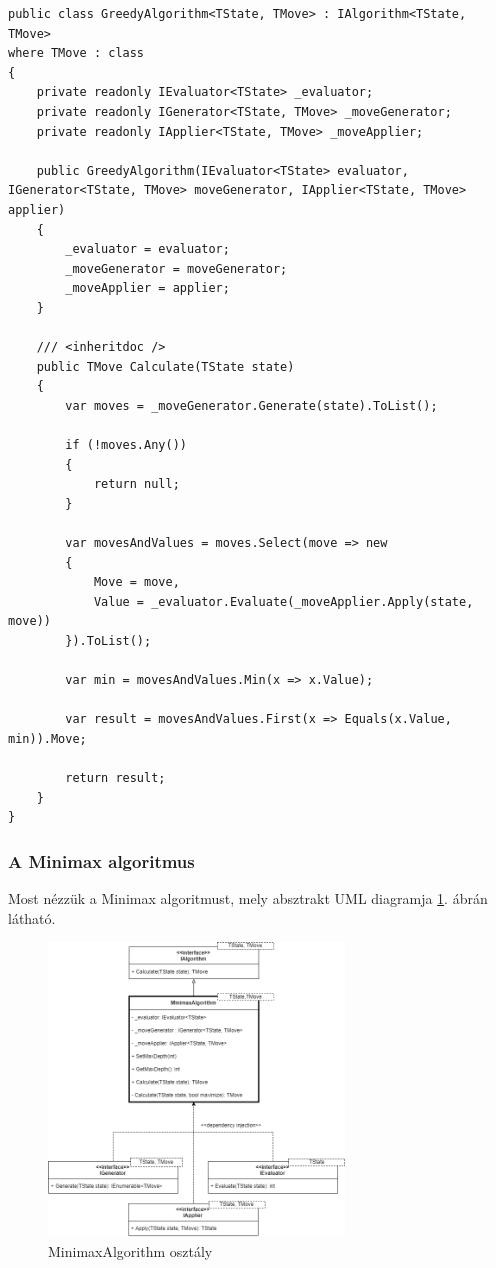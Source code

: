 \documentclass[twoside, a4paper, 12pt]{article}
\begin{document}
\begin{lstlisting}[caption=Mohó algoritmus, label=lst:greedy_code, float]
public class GreedyAlgorithm<TState, TMove> : IAlgorithm<TState, TMove>
where TMove : class
{
	private readonly IEvaluator<TState> _evaluator;
	private readonly IGenerator<TState, TMove> _moveGenerator;
	private readonly IApplier<TState, TMove> _moveApplier;
	
	public GreedyAlgorithm(IEvaluator<TState> evaluator, IGenerator<TState, TMove> moveGenerator, IApplier<TState, TMove> applier)
	{
		_evaluator = evaluator;
		_moveGenerator = moveGenerator;
		_moveApplier = applier;
	}
	
	/// <inheritdoc />
	public TMove Calculate(TState state)
	{
		var moves = _moveGenerator.Generate(state).ToList();
		
		if (!moves.Any())
		{
			return null;
		}
		
		var movesAndValues = moves.Select(move => new
		{
			Move = move,
			Value = _evaluator.Evaluate(_moveApplier.Apply(state, move))
		}).ToList();
		
		var min = movesAndValues.Min(x => x.Value);
		
		var result = movesAndValues.First(x => Equals(x.Value, min)).Move;
		
		return result;
	}
}
\end{lstlisting}

\subsubsection{A Minimax algoritmus}
Most nézzük a Minimax algoritmust, mely absztrakt UML diagramja \ref{fig:minimaxAbstractDiagram}. ábrán látható.

\begin{figure}[htbp]
	\centering
	\includegraphics[width=0.7\textwidth]{img/minimaxAbstractDiagram.png}
	\caption{MinimaxAlgorithm osztály}
	\label{fig:minimaxAbstractDiagram}
\end{figure}
\end{document}
